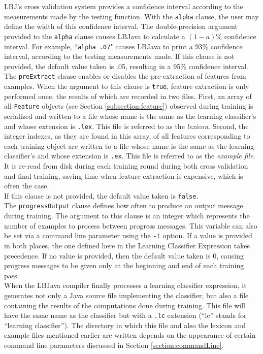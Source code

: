 LBJ's cross validation system provides a confidence interval according to the
measurements made by the testing function. With the {\tt alpha} clause, the
user may define the width of this confidence interval. The double-precision
argument provided to the {\tt alpha} clause causes LBJava to calculate a
$(1-a)\%$ confidence interval. For example, ``{\tt alpha .07}" causes LBJava to
print a $93\%$ confidence interval, according to the testing measurements
made. If this clause is not provided, the default value taken is .05, resulting 
in a 95\% confidence interval.\\

The {\tt preExtract} clause enables or disables the pre-extraction of features
from examples. When the argument to this clause is  {\tt true}, feature
extraction is only performed once, the results of which are recorded in two
files.  First, an array of all {\tt Feature} objects (see Section
\ref{subsection:feature}) observed during training is serialized and written
to a file whose name is the same as the learning classifier's and whose
extension is {\tt .lex}.  This file is referred to as the \emph{lexicon}.
Second, the integer indexes, as they are found in this array, of all features
corresponding to each training object are written to a file whose name is the
same as the learning classifier's and whose extension is {\tt .ex}.  This file
is referred to as the \emph{example file}.  It is re-read from disk during
each training round during both cross validation and final training, saving
time when feature extraction is expensive, which is often the case. \\
If this clause is not provided, the default value taken is {\tt false}.\\

The {\tt progressOutput} clause defines how often to produce an output message
during training. The argument to this clause is an integer which represents
the number of examples to process between progress messages. This variable 
can also be set via a command line parameter using the {\tt -t} option. If a value 
is provided in both places, the one defined here in the Learning Classifier Expression 
takes precedence. If no value is provided, then the default value taken is 0, 
causing progress messages to be given only at the beginning and end of each 
training pass.  \\

When the LBJava compiler finally processes a learning classifier expression, it
generates not only a Java source file implementing the classifier, but also a
file containing the results of the computations done during training.  This
file will have the same name as the classifier but with a {\tt .lc} extension
(``lc'' stands for ``learning classifier'').  The directory in which this file
and also the lexicon and example files mentioned earlier are written depends
on the appearance of certain command line parameters discussed in Section
\ref{section:commandLine}.

